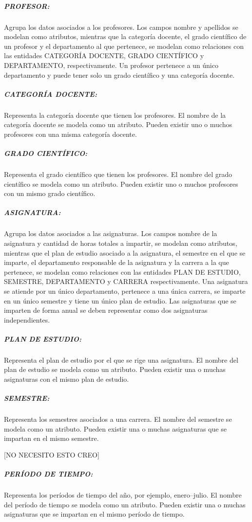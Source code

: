 \subparagraph{PROFESOR:}
Agrupa los datos asociados a los profesores.
Los campos nombre y apellidos se modelan como atributos,  
mientras que la categoría docente, el grado 
científico de un profesor y el departamento al que pertenece, se modelan como 
relaciones con las entidades CATEGORÍA DOCENTE, GRADO CIENTÍFICO y 
DEPARTAMENTO, respectivamente. Un profesor pertenece a un único departamento y puede tener solo 
un grado científico y una categoría docente. 


\subparagraph{CATEGORÍA DOCENTE:}
Representa la categoría docente que tienen los profesores.
El nombre de la categoría docente se modela como un atributo. 
Pueden existir uno o muchos profesores con una misma categoría docente.

\subparagraph{GRADO CIENTÍFICO:}
Representa el grado científico que tienen los profesores.
El nombre del grado científico se modela como un atributo.
Pueden existir uno o muchos profesores con un mismo grado científico.





\subparagraph{ASIGNATURA:}
Agrupa los datos asociados a las asignaturas.
Los campos nombre de la asignatura y cantidad de horas 
totales a impartir, se modelan como atributos, mientras que
el plan de estudio asociado a la asignatura, el semestre en el que se 
imparte, el departamento responsable de la asignatura y la carrera a la 
que pertenece, se modelan como relaciones con las entidades
PLAN DE ESTUDIO, SEMESTRE, DEPARTAMENTO y CARRERA respectivamente. Una asignatura 
se atiende por un único departamento, pertenece a una única carrera, se imparte en un 
único semestre y tiene un único plan de estudio. Las asignaturas que se imparten de forma 
anual se deben representar como dos asignaturas independientes.

\subparagraph{PLAN DE ESTUDIO:}
Representa el plan de estudio por el que se rige una asignatura.
El nombre del plan de estudio se modela como un atributo.
Pueden existir una o muchas asignaturas con el mismo plan de estudio.



\subparagraph{SEMESTRE:}
Representa los semestres asociados a una carrera. 
El nombre del semestre se modela como un atributo.
Pueden existir una o muchas asignaturas que se impartan en 
el mismo semestre. 

[NO NECESITO ESTO CREO]
\subparagraph{PERÍODO DE TIEMPO:}
Representa los períodos de tiempo del año, por ejemplo, enero--julio.
El nombre del período de tiempo se modela como un atributo.
Pueden existir una o muchas asignaturas que se impartan en 
el mismo período de tiempo.

